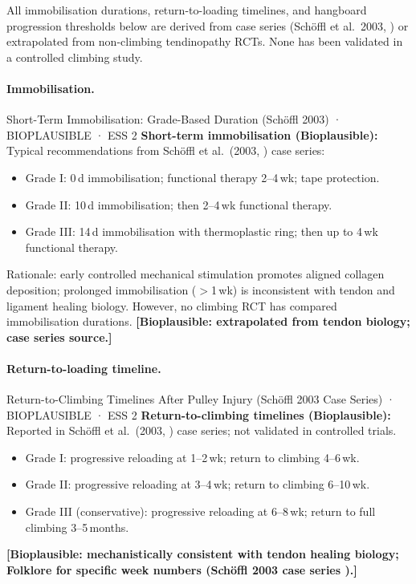 \begin{warningbox}[title=No Climbing Rehabilitation RCTs]
All immobilisation durations, return-to-loading timelines, and hangboard progression thresholds below are derived from case series (Sch\"{o}ffl et al.\ 2003, \cite{SHWS03}) or extrapolated from non-climbing tendinopathy RCTs. None has been validated in a controlled climbing study.
\end{warningbox}

\paragraph{Immobilisation.}\leavevmode

\begin{bioplausbox}{Short-Term Immobilisation: Grade-Based Duration (Schöffl 2003) · BIOPLAUSIBLE · ESS 2}
\textbf{Short-term immobilisation (Bioplausible):} Typical recommendations from Sch\"{o}ffl et al.\ (2003, \cite{SHWS03}) case series:
\begin{itemize}[leftmargin=1.5em,noitemsep]
  \item Grade I: 0\,d immobilisation; functional therapy 2--4\,wk; tape protection.
  \item Grade II: 10\,d immobilisation; then 2--4\,wk functional therapy.
  \item Grade III: 14\,d immobilisation with thermoplastic ring; then up to 4\,wk functional therapy.
\end{itemize}
Rationale: early controlled mechanical stimulation promotes aligned collagen deposition; prolonged immobilisation ($>$1\,wk) is inconsistent with tendon and ligament healing biology. However, no climbing RCT has compared immobilisation durations. \textbf{[Bioplausible: extrapolated from tendon biology; case series source.]}
\end{bioplausbox}

\paragraph{Return-to-loading timeline.}\leavevmode

\begin{bioplausbox}{Return-to-Climbing Timelines After Pulley Injury (Schöffl 2003 Case Series) · BIOPLAUSIBLE · ESS 2}
\textbf{Return-to-climbing timelines (Bioplausible):} Reported in Sch\"{o}ffl et al.\ (2003, \cite{SHWS03}) case series; not validated in controlled trials.
\begin{itemize}[leftmargin=1.5em,noitemsep]
  \item Grade I: progressive reloading at 1--2\,wk; return to climbing 4--6\,wk.
  \item Grade II: progressive reloading at 3--4\,wk; return to climbing 6--10\,wk.
  \item Grade III (conservative): progressive reloading at 6--8\,wk; return to full climbing 3--5\,months.
\end{itemize}
\textbf{[Bioplausible: mechanistically consistent with tendon healing biology; Folklore for specific week numbers (Sch\"{o}ffl 2003 case series \cite{SHWS03}).]}
\end{bioplausbox}

